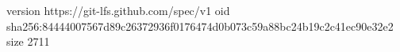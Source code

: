 version https://git-lfs.github.com/spec/v1
oid sha256:84444007567d89c26372936f0176474d0b073c59a88bc24b19c2c41ec90e32e2
size 2711
